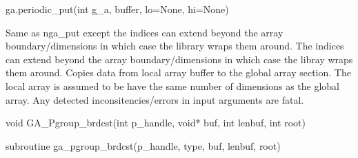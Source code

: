 \documentclass[12pt]{article}
\begin{document}
\begin{pyapi}
\begin{pycode}
ga.periodic_put(int g_a, buffer, lo=None, hi=None)
\end{pycode}
\begin{funcargs}
\end{funcargs}
\end{pyapi}

\ncoll

\begin{desc}

Same as nga_put except the indices can extend beyond the array
boundary/dimensions in which case the library wraps them around.  The indices
can extend beyond the array boundary/dimensions in which case the libray wraps
them around.  Copies data from local array buffer to the global array section.
The local array is assumed to be have the same number of dimensions as the
global array. Any detected inconsitencies/errors in input arguments are fatal.

\end{desc}



\begin{capi}
\begin{ccode}
void GA_Pgroup_brdcst(int p_handle, void* buf, int lenbuf, int root)
\end{ccode}
\begin{funcargs}
\end{funcargs}
\end{capi}

\begin{fapi}
\begin{fcode}
subroutine ga_pgroup_brdcst(p_handle, type, buf, lenbuf, root)
\end{fcode}
\begin{funcargs}
\end{funcargs}
\end{fapi}
\end{document}
